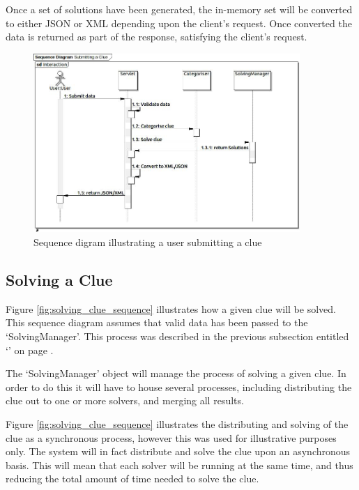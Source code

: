 Once a set of solutions have been generated, the in-memory set will be 
converted to either JSON or XML depending upon the client's request. Once 
converted the data is returned as part of the response, satisfying the client's
request.

\begin{figure}[H]
  \centering
  \includegraphics[width=0.9\textwidth]{sequence/submitting_a_clue.jpg}
  \caption{Sequence digram illustrating a user submitting a clue}
  \label{fig:submit_clue_sequence}
\end{figure}


\subsection{Solving a Clue}
\label{sub:solving_a_clue}

Figure \ref{fig:solving_clue_sequence} illustrates how a given clue will be 
solved. This sequence diagram assumes that valid data has been passed to the 
`SolvingManager'. This process was described in the previous subsection entitled
`' on page \pageref{sub:submitting_a_clue}.

The `SolvingManager' object will manage the process of solving a given clue. In 
order to do this it will have to house several processes, including distributing
the clue out to one or more solvers, and merging all results.

Figure \ref{fig:solving_clue_sequence} illustrates the distributing and solving
of the clue as a synchronous process, however this was used for illustrative
purposes only. The system will in fact distribute and solve the clue upon an
asynchronous basis. This will mean that each solver will be running at the same 
time, and thus reducing the total amount of time needed to solve the clue.

